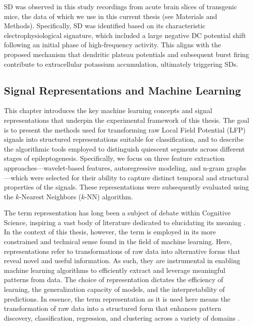 \documentclass{article}
\begin{document}
SD was observed in this study \cite{vasilopoulos2023} recordings from acute brain slices of transgenic mice, the data of which we use in this current thesis (see Materials and Methods). Specifically, SD was identified based on its characteristic electrophysiological signature, which included a large negative DC potential shift following an initial phase of high-frequency activity. This aligns with the proposed mechanism that dendritic plateau potentials and subsequent burst firing contribute to extracellular potassium accumulation, ultimately triggering SDs.

\subsection{Signal Representations and Machine Learning}

This chapter introduces the key machine learning concepts and signal representations that underpin the experimental framework of this thesis. The goal is to present the methods used for transforming raw Local Field Potential (LFP) signals into structured representations suitable for classification, and to describe the algorithmic tools employed to distinguish quiescent segments across different stages of epileptogenesis. Specifically, we focus on three feature extraction approaches—wavelet-based features, autoregressive modeling, and n-gram graphs—which were selected for their ability to capture distinct temporal and structural properties of the signals. These representations were subsequently evaluated using the $k$-Nearest Neighbors ($k$-NN) algorithm.

The term representation has long been a subject of debate within Cognitive Science, inspiring a vast body of literature dedicated to elucidating its meaning \cite{shea2018}. In the context of this thesis, however, the term is employed in its more constrained and technical sense found in the field of machine learning. Here, representations refer to transformations of raw data into alternative forms that reveal novel and useful information. As such, they are instrumental in enabling machine learning algorithms to efficiently extract and leverage meaningful patterns from data. The choice of representation dictates the efficiency of learning, the generalization capacity of models, and the interpretability of predictions. In essence, the term representation as it is used here means the transformation of raw data into a structured form that enhances pattern discovery, classification, regression, and clustering across a variety of domains \cite{bengio2013}.
\end{document}
